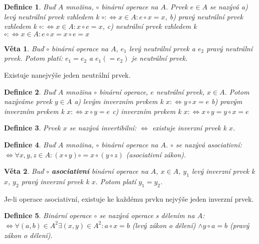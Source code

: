 \documentclass[a4paper, 11pt]{report}
\newtheorem{mydef}{Definice}[chapter]
\newtheorem{veta}{Věta}
\begin{document}
\begin{mydef}
Buď $A$ množina, $\circ$ binární operace na $A$. Prvek $e \in A$ se nazývá
a) \emph{levý neutrální prvek} vzhledem k $\circ: \Leftrightarrow x \in A : e \circ x = x$,
b) \emph{pravý neutrální prvek} vzhledem k $\circ: \Leftrightarrow x \in A : x \circ e = x$,
c) \emph{neutrální prvek} vzhledem k $\circ: \Leftrightarrow x \in A : e \circ x = x \circ e = x$
\end{mydef}

\begin{veta}
Buď $\circ$ binární operace na $A$, $e_1$ levý neutrální prvek a $e_2$ pravý neutrální prvek. Potom platí: $e_1 = e_2$ a $e_1 (= e_2)$ je neutrální prvek.
\end{veta}
Existuje nanejvýše jeden neutrální prvek.

\begin{mydef}
Buď $A$ množina $\circ$ binární operace, $e$ neutrální prvek, $x \in A$. Potom nazýváme prvek $y \in A$
a) \emph{levým inverzním prvkem} k $x: \Leftrightarrow y \circ x = e$
b) \emph{pravým inverzním prvkem} k $x: \Leftrightarrow x \circ y = e$
c) \emph{inverzním prvkem} k $x: \Leftrightarrow x \circ y = y \circ x = e$
\end{mydef}

\begin{mydef}
Prvek $x$ se nazývá invertibilní: $\Leftrightarrow$ existuje inverzní prvek k $x$.
\end{mydef}

\begin{mydef}
Buď $A$ množina, $\circ$ binární operace na $A$. $\circ$ se nazývá \emph{asociativní}: $\Leftrightarrow \forall x,y,z \in A: (x \circ y) \circ = x \circ (y \circ z)$ (asociativní zákon). 
\end{mydef}

\begin{veta}
Buď $\circ$ \textbf{asociativní} binární operace na $A$, $x \in A$, $y_1$ levý inverzní prvek k $x$, $y_2$ pravý inverzní prvek k $x$. Potom platí $y_1 = y_2$.
\end{veta}

Je-li operace asociativní, existuje ke každému prvku nejvýše jeden inverzní prvek.

\begin{mydef}
Binární operace $\circ$ se nazývá operace s dělením na $A$: $\Leftrightarrow \forall (a,b) \in A^2 \exists (x,y) \in A^2: a \circ x = b$ (levý zákon o dělení) $\land y \circ a = b$ (pravý zákon o dělení).
\end{mydef}
\end{document}
